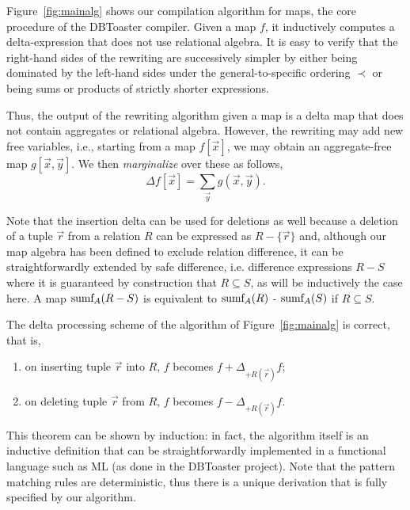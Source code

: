 \begin{figure*}[t!]
\vspace{-4mm}

\caption{Recursive algorithm for compiling the
on insert into $R$ values $\vec{r}$ trigger.}
\label{fig:mainalg}
\end{figure*}


Figure~\ref{fig:mainalg} shows our compilation algorithm for maps, the core procedure of the DBToaster compiler.
Given a map $f$, it inductively
computes a delta-expression that does not use relational algebra.
It is easy to verify that the right-hand sides of the rewriting are successively
simpler by either being dominated by the left-hand sides under the general-to-specific
ordering $\prec$ or being sums or products of
strictly shorter expressions.

Thus, the output of the rewriting algorithm given a map is a delta map that does not
contain aggregates or relational algebra. However, the rewriting may add new free
variables, i.e., starting from a map $f[\vec{x}]$, we may obtain an aggregate-free
map $g[\vec{x}, \vec{y}]$. We then {\em marginalize}\/ over these as follows,
\[
\Delta f[\vec{x}] = \sum_{\vec{y}} g(\vec{x}, \vec{y}). 
\]

Note that the insertion delta can be used for deletions as well because a deletion of
a tuple $\vec{r}$ from a relation $R$ can be expressed as $R - \{\vec{r}\}$ and,
although our map algebra has been defined to exclude relation difference,
it can be straightforwardly extended by safe difference, i.e. difference expressions
$R-S$ where it is guaranteed by construction that $R \subseteq S$, as will be inductively the case here. A map $\mbox{sumf}_A(R - S)$ is equivalent to
$\mbox{sumf}_A(R)$ - $\mbox{sumf}_A(S)$ if $R \subseteq S$.



\begin{theorem}
The delta processing scheme of the algorithm of Figure~\ref{fig:mainalg} is correct,
that is,
\begin{enumerate}
\item
on inserting tuple $\vec{r}$ into $R$, $f$ becomes
$f + \Delta_{+R(\vec{r})} f$;

\item
on deleting tuple $\vec{r}$ from $R$, $f$ becomes
$f - \Delta_{+R(\vec{r})} f$.
\end{enumerate}
\end{theorem}


This theorem can be shown by induction: in fact, the algorithm itself is an inductive
definition that can be straightforwardly implemented in a functional language such as
ML (as done in the DBToaster project). Note that the pattern matching rules are
deterministic, thus there is a unique derivation that is fully specified by our
algorithm.



